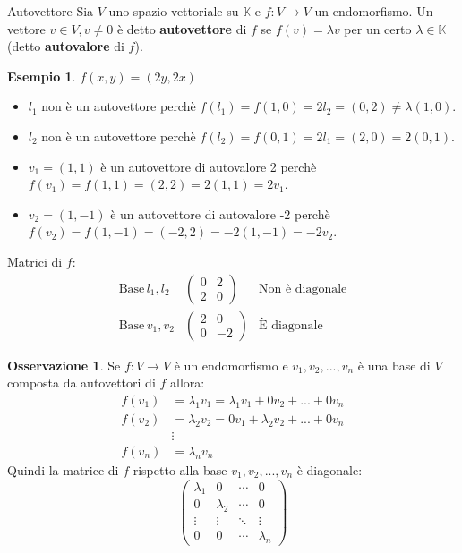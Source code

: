 \documentclass[a4paper]{article}
\theoremstyle{definition}
\newtheorem*{oss}{Osservazione}
\newtheorem*{es}{Esempio}
\begin{document}
	\begin{deff}{Autovettore}{}
		Sia $V$ uno spazio vettoriale su $\mathbb{K}$ e $f: V \to V$ un endomorfismo.
		Un vettore $v \in V, v \ne 0$ è detto \textbf{autovettore} di $f$ se $f(v) = \lambda v$ per un certo $\lambda \in \mathbb{K}$ (detto \textbf{autovalore} di $f$).
	\end{deff}
	\begin{es}
		$f(x, y) = (2y, 2x)$
		\begin{itemize}
			\item $l_1$ non è un autovettore perchè $f(l_1) = f(1, 0) = 2l_2 = (0, 2) \ne \lambda (1, 0)$.
			\item $l_2$ non è un autovettore perchè $f(l_2) = f(0, 1) = 2l_1 = (2, 0) = 2(0, 1)$.
			\item $v_1 = (1, 1)$ è un autovettore di autovalore 2 perchè $f(v_1) = f(1, 1) = (2, 2) = 2(1, 1) = 2v_1$.
			\item $v_2 = (1, -1)$ è un autovettore di autovalore -2 perchè $f(v_2) = f(1, -1) = (-2, 2) = -2(1, -1) = -2v_2$.
		\end{itemize}
		Matrici di $f$:
		\begin{align*}
			\text{Base}\, l_1, l_2 & \begin{pmatrix}
				0 & 2 \\
				2 & 0
			\end{pmatrix} & \text{Non è diagonale} \\
			\text{Base}\, v_1, v_2 & \begin{pmatrix}
				2 & 0 \\
				0 & -2
			\end{pmatrix} & \text{È diagonale}
		\end{align*}
	\end{es}
	\begin{oss}
		Se $f: V \to V$ è un endomorfismo e $v_1, v_2, ..., v_n$ è una base di $V$ composta da autovettori di $f$ allora:
		\begin{align*}
			f(v_1) &= \lambda_1 v_1 = \lambda_1 v_1 + 0v_2 + ... + 0v_n \\
			f(v_2) &= \lambda_2 v_2 = 0v_1 + \lambda_2 v_2 + ... + 0v_n \\
			&\vdots \\
			f(v_n) &= \lambda_n v_n
		\end{align*}
		Quindi la matrice di $f$ rispetto alla base $v_1, v_2, ..., v_n$ è diagonale:
		\begin{equation*}
			\begin{pmatrix}
				\lambda_1 & 0 & \cdots & 0 \\
				0 & \lambda_2 & \cdots & 0 \\
				\vdots & \vdots & \ddots & \vdots \\
				0 & 0 & \cdots & \lambda_n
			\end{pmatrix}
		\end{equation*}
	\end{oss}
\end{document}
